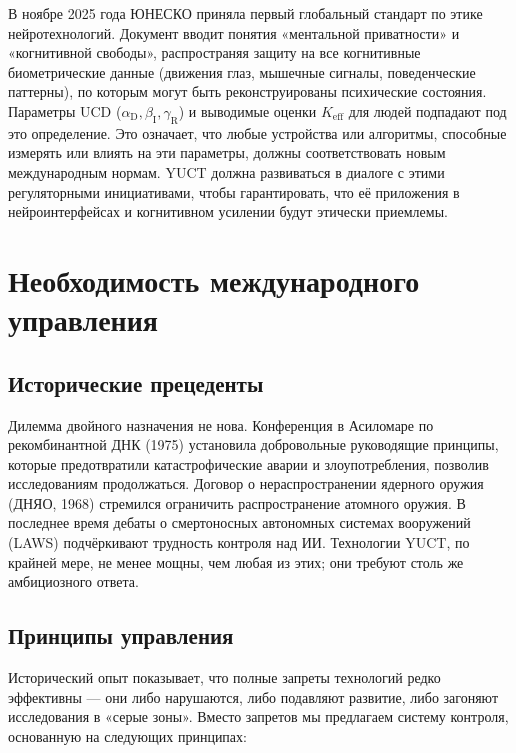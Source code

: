 \documentclass[12pt,a4paper]{article}
\theoremstyle{remark}
\newcommand{\Keff}{K_{\mathrm{eff}}}
\newcommand{\alD}{\alpha_{\mathrm{D}}}
\newcommand{\beI}{\beta_{\mathrm{I}}}
\newcommand{\gaR}{\gamma_{\mathrm{R}}}
\begin{document}
	В ноябре 2025 года ЮНЕСКО приняла первый глобальный стандарт по этике нейротехнологий. Документ вводит понятия «ментальной приватности» и «когнитивной свободы», распространяя защиту на все когнитивные биометрические данные (движения глаз, мышечные сигналы, поведенческие паттерны), по которым могут быть реконструированы психические состояния. Параметры UCD (\(\alD,\beI,\gaR\)) и выводимые оценки \(\Keff\) для людей подпадают под это определение. Это означает, что любые устройства или алгоритмы, способные измерять или влиять на эти параметры, должны соответствовать новым международным нормам. YUCT должна развиваться в диалоге с этими регуляторными инициативами, чтобы гарантировать, что её приложения в нейроинтерфейсах и когнитивном усилении будут этически приемлемы.
	
	\section{Необходимость международного управления}
	\label{sec:governance}
	
	\subsection{Исторические прецеденты}
	\label{subsec:precedents}
	
	Дилемма двойного назначения не нова. Конференция в Асиломаре по рекомбинантной ДНК (1975) установила добровольные руководящие принципы, которые предотвратили катастрофические аварии и злоупотребления, позволив исследованиям продолжаться. Договор о нераспространении ядерного оружия (ДНЯО, 1968) стремился ограничить распространение атомного оружия. В последнее время дебаты о смертоносных автономных системах вооружений (LAWS) подчёркивают трудность контроля над ИИ. Технологии YUCT, по крайней мере, не менее мощны, чем любая из этих; они требуют столь же амбициозного ответа.
	
	\subsection{Принципы управления}
	\label{subsec:principles}
	
	Исторический опыт показывает, что полные запреты технологий редко эффективны — они либо нарушаются, либо подавляют развитие, либо загоняют исследования в «серые зоны». Вместо запретов мы предлагаем систему контроля, основанную на следующих принципах:
	
\end{document}
